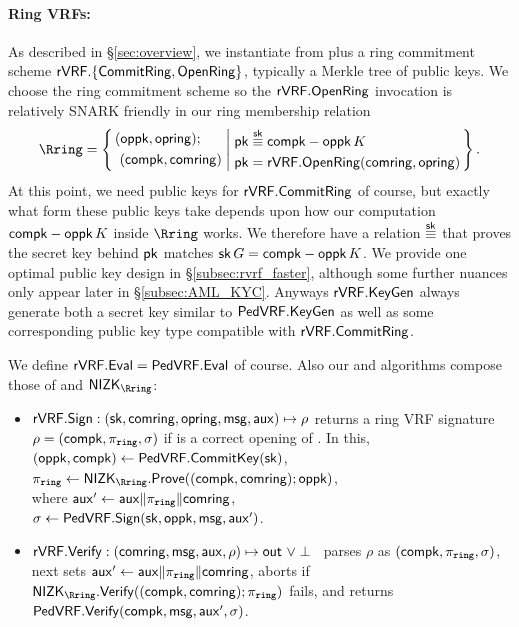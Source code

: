 \paragraph{Ring VRFs:}
As described in \S\ref{sec:overview},
we instantiate \rVRF from \PedVRF plus a ring commitment scheme
 ${\mathsf{rVRF}}.\{ {\mathsf{CommitRing}}, {\mathsf{OpenRing}} \}$,
typically a Merkle tree of public keys.
We choose the ring commitment scheme so the ${\mathsf{rVRF}}.{\mathsf{OpenRing}}$ invocation
is relatively SNARK friendly in our ring membership relation
$$ \Rring = \Setst{ 
  \begin{aligned}
    & (\openpk, \openring); \\ 
    & \,\, (\compk,\comring) 
  \end{aligned}
}{
  \begin{aligned}
    \pk &\overset{\sk}{\equiv} \compk - \openpk \, \genB \\
    \pk &= \rVRF.\OpenRing(\comring,\openring)
  \end{aligned}
} \mathperiod $$
At this point, we need public keys for ${\mathsf{rVRF}}.{\mathsf{CommitRing}}$ of course,
but exactly what form these public keys take depends upon how our computation
 $\mathsf{compk} - \mathsf{oppk} \, K$ inside $\Rring$ works.
We therefore have a relation $\overset{\mathsf{sk}}{\equiv}$ that proves
 the secret key behind $\mathsf{pk}$ matches $\mathsf{sk} \, G = \mathsf{compk} - \mathsf{oppk} \, K$.
We provide one optimal public key design in \S\ref{subsec:rvrf_faster},
 although some further nuances only appear later in \S\ref{subsec:AML_KYC}.
Anyways ${\mathsf{rVRF}}.{\mathsf{KeyGen}}$ always generate both a secret key similar to
${\mathsf{PedVRF}}.{\mathsf{KeyGen}}$ as well as some corresponding public key type
 compatible with ${\mathsf{rVRF}}.{\mathsf{CommitRing}}$.

We define ${\mathsf{rVRF}}.{\mathsf{Eval}} = {\mathsf{PedVRF}}.{\mathsf{Eval}}$ of course.
Also our \Sign and \Verify algorithms compose those of \PedVRF and
 $\NIZK_{\Rring}$:
\def\tmpaux{\aux \doubleplus \piring \doubleplus \comring}
\def\tmpeprintaux{\eprint{\aux'}{\tmpaux}}
\def\tmpindent{\hspace*{5pt}}
\begin{itemize}
	\item ${\mathsf{rVRF}}.{\mathsf{Sign}} : (\mathsf{sk},\mathsf{comring}, \mathsf{opring},\mathsf{msg},\mathsf{aux}) \mapsto \rho$
	returns a ring VRF signature $\rho = (\mathsf{compk},\pi_{\mathtt{ring}},\sigma)$
	if \openring is a correct opening of \comring.  In this, 
	\tmpindent $(\mathsf{oppk},\mathsf{compk}) \leftarrow {\ensuremath{\mathsf{PedVRF}}}.{\mathsf{CommitKey}}(\mathsf{sk})$,  \\
	\tmpindent $\piring \leftarrow \NIZK_{\Rring}.\Prove((\compk,\comring); \openpk)$, \\
	where 
	\tmpindent $\aux' \leftarrow \tmpaux$,  \\
	\tmpindent $\sigma \leftarrow {\ensuremath{\mathsf{PedVRF}}}.{\mathsf{Sign}}(\mathsf{sk},\mathsf{oppk},\mathsf{msg}, \mathsf{aux}')$.

	\item ${\mathsf{rVRF}}.{\mathsf{Verify}} : (\mathsf{comring},\mathsf{msg},\mathsf{aux},\rho) \mapsto {\ensuremath{\mathsf{out}}} \,\, \lor \perp$ \,
	parses $\rho$ as $(\mathsf{compk},\pi_{\mathtt{ring}},\sigma)$, next sets $\aux' \leftarrow \tmpaux$,
	aborts if $\NIZK_{\Rring}.\Verify((\compk,\comring); \piring)$ fails,
	and returns ${\mathsf{PedVRF}}.{\mathsf{Verify}}(\mathsf{compk},\mathsf{msg}, \mathsf{aux}', \sigma)$.
\end{itemize}

